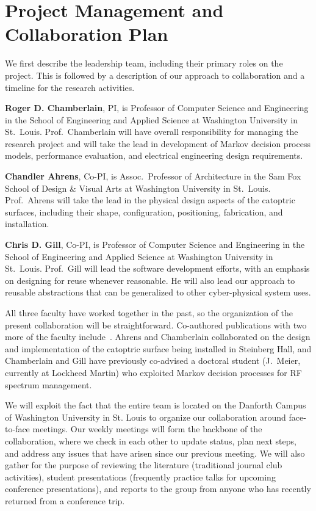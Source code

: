 \section{Project Management and Collaboration Plan}
\label{sec:collab}

We first describe the leadership team, including their primary roles
on the project.  This is followed by a description of our approach
to collaboration and a timeline for the research activities.

{\bf Roger D. Chamberlain}, PI, is Professor of Computer Science
and Engineering in the School of Engineering and Applied Science
at Washington University in St.~Louis.
Prof.~Chamberlain will have overall responsibility for managing the
research project and will take the lead in development of Markov
decision process models, performance evaluation, and electrical engineering
design requirements.

{\bf Chandler Ahrens}, Co-PI, is Assoc.~Professor of Architecture
in the Sam Fox School of Design \& Visual Arts
at Washington University in St.~Louis.
Prof.~Ahrens will take the lead in the physical design aspects of
the catoptric surfaces, including their shape, configuration, positioning,
fabrication, and installation.

{\bf Chris D. Gill}, Co-PI, is Professor of Computer Science
and Engineering in the School of Engineering and Applied Science
at Washington University in St.~Louis.
Prof.~Gill will lead the software development efforts, with an emphasis
on designing for reuse whenever reasonable.  He will also lead our
approach to reusable abstractions that can be generalized to other
cyber-physical system uses.

All three faculty have worked together in the past, so the organization
of the present collaboration will be straightforward.  Co-authored
publications with two more of the faculty
include~\cite{cag18,mgc16, mskgct13}. Ahrens and Chamberlain collaborated
on the design and implementation of the catoptric surface being
installed in Steinberg Hall, and Chamberlain and Gill have previously
co-advised a doctoral student (J.~Meier, currently at Lockheed Martin)
who exploited Markov decision processes for RF spectrum management.

We will exploit the fact that the entire team is located on the
Danforth Campus of Washington University in St. Louis to organize
our collaboration around face-to-face meetings.  Our weekly meetings will
form the backbone of the collaboration, where we check in each other to
update status, plan next steps, and address any issues that have arisen
since our previous meeting.
We will also gather for the purpose of reviewing the literature
(traditional journal club activities), student presentations (frequently
practice talks for upcoming conference presentations), and reports
to the group from anyone who has recently returned from a conference trip.

